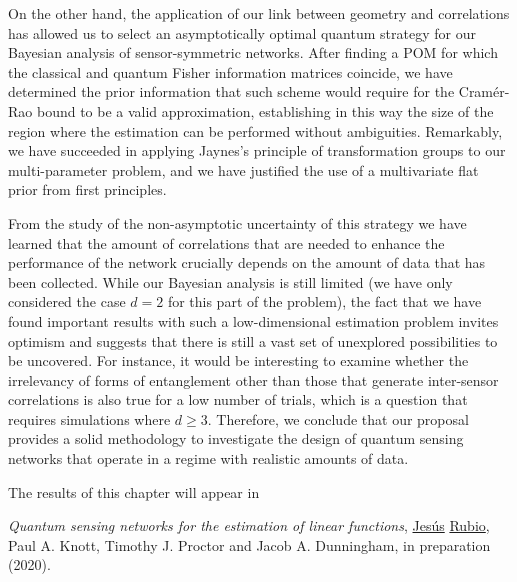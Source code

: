 On the other hand, the application of our link between geometry and correlations has allowed us to select an asymptotically optimal quantum strategy for our Bayesian analysis of sensor-symmetric networks. After finding a POM for which the classical and quantum Fisher information matrices coincide, we have determined the prior information that such scheme would require for the Cram\'{e}r-Rao bound to be a valid approximation, establishing in this way the size of the region where the estimation can be performed without ambiguities. Remarkably, we have succeeded in applying Jaynes's principle of transformation groups to our multi-parameter problem, and we have justified the use of a multivariate flat prior from first principles. 

From the study of the non-asymptotic uncertainty of this strategy we have learned that the amount of correlations that are needed to enhance the performance of the network crucially depends on the amount of data that has been collected. While our Bayesian analysis is still limited (we have only considered the case $d = 2$ for this part of the problem), the fact that we have found important results with such a low-dimensional estimation problem invites optimism and suggests that there is still a vast set of unexplored possibilities to be uncovered. For instance, it would be interesting to examine whether the irrelevancy of forms of entanglement other than those that generate inter-sensor correlations is also true for a low number of trials, which is a question that requires simulations where $d \geqslant 3$. Therefore, we conclude that our proposal provides a solid methodology to investigate the design of quantum sensing networks that operate in a regime with realistic amounts of data. 

The results of this chapter will appear in \cite{jesus2019a}
\begin{displayquote}
\emph{Quantum sensing networks for the estimation of linear functions}, \underline{Jes\'{u}s} \underline{Rubio}, Paul A. Knott, Timothy J. Proctor and Jacob A. Dunningham, in preparation (2020).
\end{displayquote}